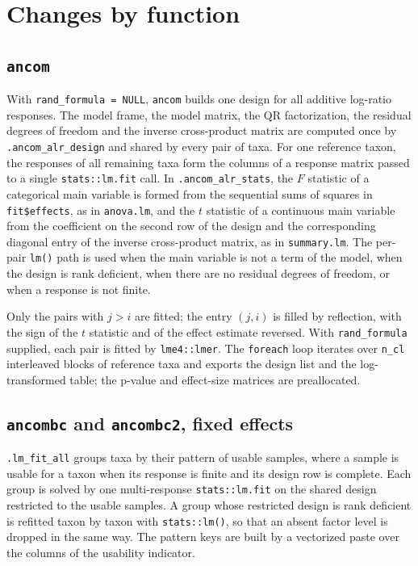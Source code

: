 \documentclass[11pt]{article}
\newcommand{\code}[1]{\texttt{#1}}
\begin{document}
\section{Changes by function}

\subsection*{\code{ancom}}

With \code{rand\_formula = NULL}, \code{ancom} builds one design for all
additive log-ratio responses. The model frame, the model matrix, the QR
factorization, the residual degrees of freedom and the inverse cross-product
matrix are computed once by \code{.ancom\_alr\_design} and shared by every pair
of taxa. For one reference taxon, the responses of all remaining taxa form the
columns of a response matrix passed to a single \code{stats::lm.fit} call. In
\code{.ancom\_alr\_stats}, the $F$ statistic of a categorical main variable is
formed from the sequential sums of squares in \code{fit\$effects}, as in
\code{anova.lm}, and the $t$ statistic of a continuous main variable from the
coefficient on the second row of the design and the corresponding diagonal
entry of the inverse cross-product matrix, as in \code{summary.lm}. The
per-pair \code{lm()} path is used when the main variable is not a term of the
model, when the design is rank deficient, when there are no residual degrees of
freedom, or when a response is not finite.

Only the pairs with $j > i$ are fitted; the entry $(j, i)$ is filled by
reflection, with the sign of the $t$ statistic and of the effect estimate
reversed. With \code{rand\_formula} supplied, each pair is fitted by
\code{lme4::lmer}. The \code{foreach} loop iterates over \code{n\_cl}
interleaved blocks of reference taxa and exports the design list and the
log-transformed table; the p-value and effect-size matrices are preallocated.

\subsection*{\code{ancombc} and \code{ancombc2}, fixed effects}

\code{.lm\_fit\_all} groups taxa by their pattern of usable samples, where a
sample is usable for a taxon when its response is finite and its design row is
complete. Each group is solved by one multi-response \code{stats::lm.fit} on
the shared design restricted to the usable samples. A group whose restricted
design is rank deficient is refitted taxon by taxon with \code{stats::lm()}, so
that an absent factor level is dropped in the same way. The pattern keys are
built by a vectorized paste over the columns of the usability indicator.
\end{document}
